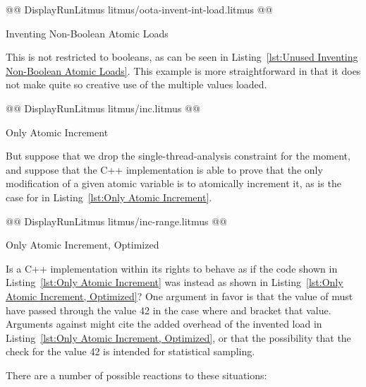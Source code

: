 \documentclass[10]{article}
\begin{document}
\begin{listing}[tbp]
@@ DisplayRunLitmus litmus/oota-invent-int-load.litmus @@
\caption{Inventing Non-Boolean Atomic Loads}
\label{lst:Unused Inventing Non-Boolean Atomic Loads}
\end{listing}

This is not restricted to booleans, as can be seen in
Listing~\ref{lst:Unused Inventing Non-Boolean Atomic Loads}.
This example is more straightforward in that it does not make quite so
creative use of the multiple values loaded.

\begin{listing}[tbp]
@@ DisplayRunLitmus litmus/inc.litmus @@
\caption{Only Atomic Increment}
\label{lst:Only Atomic Increment}
\end{listing}

But suppose that we drop the single-thread-analysis constraint for
the moment, and suppose that the C++ implementation is able to prove
that the only modification of a given atomic variable is to atomically
increment it, as is the case for  in
Listing~\ref{lst:Only Atomic Increment}.

\begin{listing}[tbp]
@@ DisplayRunLitmus litmus/inc-range.litmus @@
\caption{Only Atomic Increment, Optimized}
\label{lst:Only Atomic Increment, Optimized}
\end{listing}

Is a C++ implementation within its rights to behave as if the code
shown in
Listing~\ref{lst:Only Atomic Increment}
was instead as shown in
Listing~\ref{lst:Only Atomic Increment, Optimized}?
One argument in favor is that the value of  must have
passed through the value 42 in the case where  and 
bracket that value.
Arguments against might cite the added overhead of the invented load
in Listing~\ref{lst:Only Atomic Increment, Optimized}, or that the
possibility that the check for the value 42 is intended for statistical
sampling.

There are a number of possible reactions to these situations:
\end{document}
